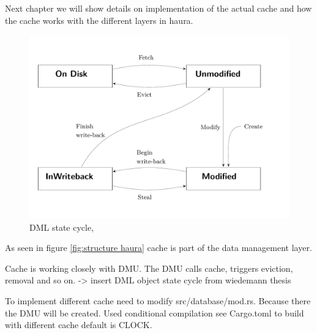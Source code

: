 \documentclass[
	12pt,
	a4paper,
	abstract,
	bibliography=totoc,
	chapterprefix,
	headings=openright,
	numbers=endperiod,
	parskip=half,
	twoside,
]{scrreprt}
\begin{document}
Next chapter we will show details on implementation of the actual cache and how the cache works with the different layers in haura.

\begin{figure}[ht]
	\centering
	\includegraphics[scale=0.4]{DML_state_cycle.pdf}
	\caption{DML state cycle, \cite{wiedemann2018modern}}
		\label{fig:DML state cycle}
\end{figure}

As seen in figure \ref{fig:structure haura} cache is part of the data management layer.

Cache is working closely with DMU.
The DMU calls cache, triggers eviction, removal and so on.
-> insert DML object state cycle from wiedemann thesis






To implement different cache need to modify src/database/mod.rs.
Because there the DMU will be created.
Used conditional compilation see Cargo.toml to build with different cache default is CLOCK.






\end{document}
